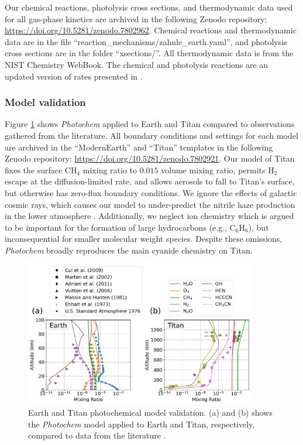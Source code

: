Our chemical reactions, photolysis cross sections, and thermodynamic data used for all gas-phase kinetics are archived in the following Zenodo repository: \url{https://doi.org/10.5281/zenodo.7802962}. Chemical reactions and thermodynamic data are in the file ``reaction\_mechanisms/zahnle\_earth.yaml'', and photolysis cross sections are in the folder ``xsections/''. All thermodynamic data is from the NIST Chemistry WebBook. The chemical and photolysis reactions are an updated version of rates presented in \citet{Zahnle_2016}.

\subsubsection{Model validation}

Figure \ref{fig:earth_titan_valid} shows \emph{Photochem} applied to Earth and Titan compared to observations gathered from the literature. All boundary conditions and settings for each model are archived in the ``ModernEarth'' and ``Titan'' templates in the following Zenodo repository: \url{https://doi.org/10.5281/zenodo.7802921}. Our model of Titan fixes the surface CH$_4$ mixing ratio to $0.015$ volume mixing ratio, permits H$_2$ escape at the diffusion-limited rate, and allows aerosols to fall to Titan's surface, but otherwise has zero-flux boundary conditions. We ignore the effects of galactic cosmic rays, which causes our model to under-predict the nitrile haze production in the lower atmosphere \citep{Lavvas_2008b}. Additionally, we neglect ion chemistry which is argued to be important for the formation of large hydrocarbons (e.g., $\mathrm{C_6H_6}$), but inconsequential for smaller molecular weight species. Despite these omissions, \emph{Photochem} broadly reproduces the main cyanide chemistry on Titan.

\begin{figure}
  \centering
  \includegraphics[width=0.9\textwidth]{tex/5impacts/figures/supplement/Earth_Titan_validation.pdf}
  \caption{Earth and Titan photochemical model validation. (a) and (b) shows the \emph{Photochem} model applied to Earth and Titan, respectively, compared to data from the literature \citep{Cui_2009,Marten_2002,Adriani_2011,Vuitton_2006,Massie_1981,Ehhalt_1975}.}
  \label{fig:earth_titan_valid}
\end{figure}

